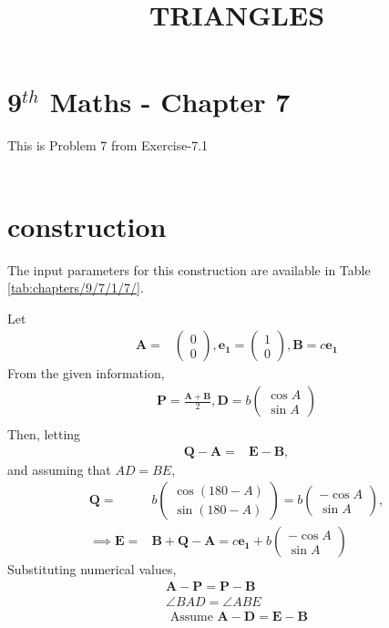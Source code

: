 \documentclass[10pt]{article}
\newcommand{\myvec}[1]{\ensuremath{\begin{pmatrix}#1\end{pmatrix}}}
\let\vec\mathbf{}
\begin{document}
\begin{center}
\title{\textbf{TRIANGLES}}
\date{\vspace{-5ex}} %
\maketitle
\end{center}
\section{9$^{th}$ Maths - Chapter 7}

This is Problem 7 from Exercise-7.1\\\\
\section{construction}
\fi
The input parameters for this construction are
available in Table
\ref{tab:chapters/9/7/1/7/}.
\begin{table}[H]
	\centering
 	
\caption{}
\label{tab:chapters/9/7/1/7/}
\end{table}
Let
\begin{align}
\vec{A}=&\myvec{0\\0},\vec{e_1}=\myvec{1\\0},\vec{B}=c\vec{e_1}
\end{align}
From the given information,
\begin{align}
	\vec{P}=\frac{\vec{A}+\vec{B}}{2},\vec{D}=b\myvec{\cos{A}\\\sin{A}}\\
\end{align}
Then, letting
\begin{align}
\vec{Q}-\vec{A} =&\vec{E}-\vec{B}, 
\end{align}
and assuming that $AD = BE$,
\begin{align}
\vec{Q}=&b\myvec{\cos{(180-A)}\\\sin{(180-A)}}=b\myvec{-\cos{A}\\\sin{A}},\\
\implies \vec{E}=&\vec{B}+\vec{Q}-\vec{A}=c\vec{e_1}+b\myvec{-\cos{A}\\\sin{A}}
\end{align}
Substituting numerical values, 
\iffalse
\begin{align}
\vec{A}-\vec{P} = \vec{P}-\vec{B}\\
\angle BAD = \angle ABE\\
\text { Assume  }\vec{A}-\vec{D}=\vec{E}-\vec{B}
\end{align}
\end{document}
